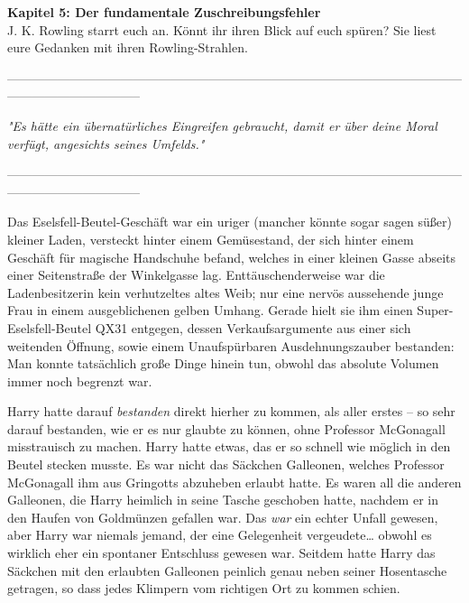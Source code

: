 

\hypertarget{der-fundamentale-zuschreibungsfehler}{%

\textbf{Kapitel 5: Der fundamentale Zuschreibungsfehler}\\

J. K. Rowling starrt euch an. Könnt ihr ihren Blick auf euch spüren? Sie liest eure Gedanken mit ihren Rowling-Strahlen.

--------------------------------------------------------------------------------------------------------------------------------------------

\emph{\emph{"Es hätte ein übernatürliches Eingreifen gebraucht, damit er über deine Moral verfügt, angesichts seines Umfelds."}}

--------------------------------------------------------------------------------------------------------------------------------------------

Das Eselsfell-Beutel-Geschäft war ein uriger (mancher könnte sogar sagen süßer) kleiner Laden, versteckt hinter einem Gemüsestand, der sich hinter einem Geschäft für magische Handschuhe befand, welches in einer kleinen Gasse abseits einer Seitenstraße der Winkelgasse lag. Enttäuschenderweise war die Ladenbesitzerin kein verhutzeltes altes Weib; nur eine nervös aussehende junge Frau in einem ausgeblichenen gelben Umhang. Gerade hielt sie ihm einen Super-Eselsfell-Beutel QX31 entgegen, dessen Verkaufsargumente aus einer sich weitenden Öffnung, sowie einem Unaufspürbaren Ausdehnungszauber bestanden: Man konnte tatsächlich große Dinge hinein tun, obwohl das absolute Volumen immer noch begrenzt war.

Harry hatte darauf \emph{bestanden} direkt hierher zu kommen, als aller erstes -- so sehr darauf bestanden, wie er es nur glaubte zu können, ohne Professor McGonagall misstrauisch zu machen. Harry hatte etwas, das er so schnell wie möglich in den Beutel stecken musste. Es war nicht das Säckchen Galleonen, welches Professor McGonagall ihm aus Gringotts abzuheben erlaubt hatte. Es waren all die anderen Galleonen, die Harry heimlich in seine Tasche geschoben hatte, nachdem er in den Haufen von Goldmünzen gefallen war. Das \emph{war} ein echter Unfall gewesen, aber Harry war niemals jemand, der eine Gelegenheit vergeudete… obwohl es wirklich eher ein spontaner Entschluss gewesen war. Seitdem hatte Harry das Säckchen mit den erlaubten Galleonen peinlich genau neben seiner Hosentasche getragen, so dass jedes Klimpern vom richtigen Ort zu kommen schien.

}
